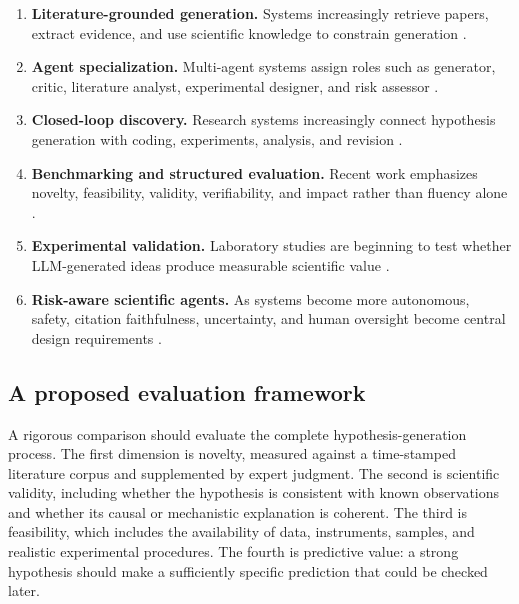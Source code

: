 \documentclass[11pt]{article}
\begin{document}
\begin{enumerate}
  \item \textbf{Literature-grounded generation.} Systems increasingly retrieve papers, extract evidence,
  and use scientific knowledge to constrain generation
  \cite{zhou2024hypothesis,wang2024scimon,qi2024biomedical}.

  \item \textbf{Agent specialization.} Multi-agent systems assign roles such as generator, critic,
  literature analyst, experimental designer, and risk assessor
  \cite{su2025many,gottweis2025towards}.

  \item \textbf{Closed-loop discovery.} Research systems increasingly connect hypothesis generation
  with coding, experiments, analysis, and revision
  \cite{lu2024ai,yamada2026towards,gottweis2025towards,boiko2023autonomous}.

  \item \textbf{Benchmarking and structured evaluation.} Recent work emphasizes novelty, feasibility,
  validity, verifiability, and impact rather than fluency alone
  \cite{si2025novel,guo2025ideabench,qi2024biomedical}.

  \item \textbf{Experimental validation.} Laboratory studies are beginning to test whether LLM-generated
  ideas produce measurable scientific value
  \cite{virtuallab2024,boiko2023autonomous,scientific2025laboratory}.

  \item \textbf{Risk-aware scientific agents.} As systems become more autonomous, safety, citation
  faithfulness, uncertainty, and human oversight become central design requirements
  \cite{goo2026citation,safescientist2025,hong2024metagpt}.
\end{enumerate}

\subsection{A proposed evaluation framework}
\label{subsec:evaluation-framework}

A rigorous comparison should evaluate the complete hypothesis-generation process. The first
dimension is novelty, measured against a time-stamped literature corpus and supplemented by
expert judgment. The second is scientific validity, including whether the hypothesis is consistent
with known observations and whether its causal or mechanistic explanation is coherent. The third is
feasibility, which includes the availability of data, instruments, samples, and realistic experimental
procedures. The fourth is predictive value: a strong hypothesis should make a sufficiently specific
prediction that could be checked later.
\end{document}
